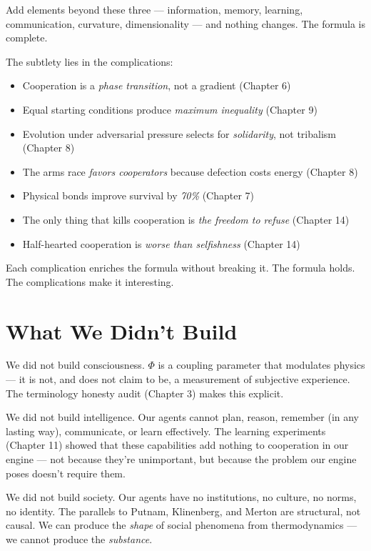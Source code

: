 Add elements beyond these three --- information, memory, learning, communication, curvature, dimensionality --- and nothing changes. The formula is complete.

The subtlety lies in the complications:

\begin{itemize}
\tightlist
\item
  Cooperation is a \emph{phase transition}, not a gradient (Chapter 6)
\item
  Equal starting conditions produce \emph{maximum inequality} (Chapter 9)
\item
  Evolution under adversarial pressure selects for \emph{solidarity}, not tribalism (Chapter 8)
\item
  The arms race \emph{favors cooperators} because defection costs energy (Chapter 8)
\item
  Physical bonds improve survival by \emph{70\%} (Chapter 7)
\item
  The only thing that kills cooperation is \emph{the freedom to refuse} (Chapter 14)
\item
  Half-hearted cooperation is \emph{worse than selfishness} (Chapter 14)
\end{itemize}

Each complication enriches the formula without breaking it. The formula holds. The complications make it interesting.

\section{What We Didn't Build}\label{what-we-didnt-build}

We did not build consciousness. $\Phi$ is a coupling parameter that modulates physics --- it is not, and does not claim to be, a measurement of subjective experience. The terminology honesty audit (Chapter 3) makes this explicit.

We did not build intelligence. Our agents cannot plan, reason, remember (in any lasting way), communicate, or learn effectively. The learning experiments (Chapter 11) showed that these capabilities add nothing to cooperation in our engine --- not because they're unimportant, but because the problem our engine poses doesn't require them.

We did not build society. Our agents have no institutions, no culture, no norms, no identity. The parallels to Putnam, Klinenberg, and Merton are structural, not causal. We can produce the \emph{shape} of social phenomena from thermodynamics --- we cannot produce the \emph{substance}.

